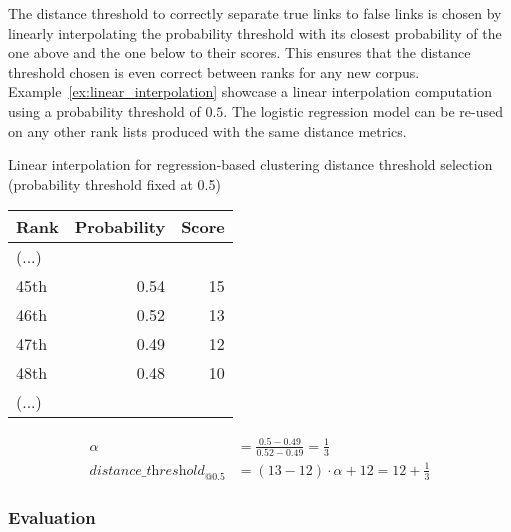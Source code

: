 The distance threshold to correctly separate true links to false links is chosen by linearly interpolating the probability threshold with its closest probability of the one above and the one below to their scores.
This ensures that the distance threshold chosen is even correct between ranks for any new corpus.
Example~\ref{ex:linear_interpolation} showcase a linear interpolation computation using a probability threshold of $0.5$.
The logistic regression model can be re-used on any other rank lists produced with the same distance metrics.

\begin{example}
  \centering
  \caption{Linear interpolation for regression-based clustering distance threshold selection (probability threshold fixed at 0.5)}
  \label{ex:linear_interpolation}

  \begin{subexample}{\linewidth}
    \centering
    \begin{tabular}{l r r}
      \toprule
      Rank & Probability & Score \\
      \midrule
      (...) & &\\
      45th & 0.54 & 15 \\
      46th & 0.52 & 13 \\
      47th & 0.49 & 12 \\
      48th & 0.48 & 10 \\
      (...) & & \\
      \bottomrule
    \end{tabular}
  \end{subexample}

  \vspace{0.5cm}

  \begin{subexample}{\linewidth}
    \centering
    \begin{align}
        \alpha &= \frac{0.5 - 0.49}{0.52 - 0.49} = \frac{1}{3} \\
        \textit{distance\_threshold}_{@0.5} &= (13 - 12) \cdot \alpha + 12 = 12 + \frac{1}{3}
    \end{align}
  \end{subexample}
\end{example}


\subsubsection{Evaluation}



